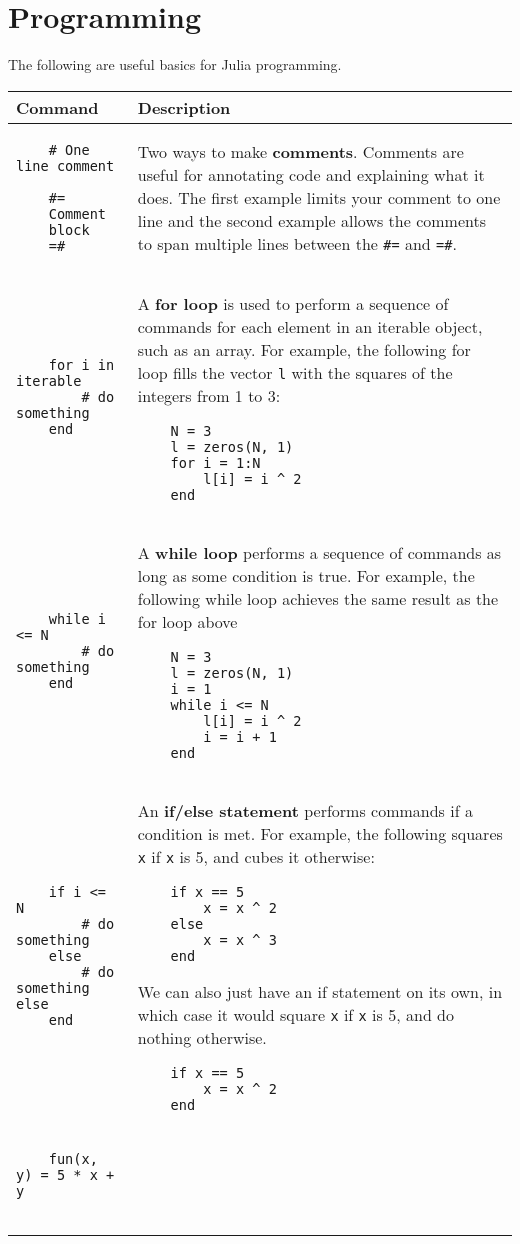 \documentclass[]{article}
\begin{document}
\section{Programming}
The following are useful basics for Julia programming.
\begin{longtable}{ |m{6cm}  | m{11cm} |}
	\hline
	\textbf{Command} & \textbf{Description}
	\\\hline
	\begin{verbatim}
    # One line comment

    #=
    Comment 
    block
    =#
	\end{verbatim}
	& Two ways to make \textbf{comments}. Comments are useful for annotating
    code and explaining what it does. The first example limits your comment to
    one line and the second example allows the comments to span multiple lines
    between the \texttt{\#=} and \texttt{=\#}.
    \\\hline
\begin{verbatim}
    for i in iterable
        # do something
    end
	\end{verbatim}
	& A \textbf{for loop} is used to perform a sequence of commands for each
    element in an iterable object, such as an array. For example, the
    following for loop fills the vector \texttt{l} with the squares of the
    integers from 1 to 3:
    \begin{verbatim}
    N = 3
    l = zeros(N, 1)
    for i = 1:N
        l[i] = i ^ 2
    end
    \end{verbatim}
    \\\hline
\begin{verbatim}
    while i <= N
        # do something
    end
	\end{verbatim}
	& A \textbf{while loop} performs a sequence of commands as long as some
    condition is true. For example, the
    following while loop achieves the same result as the for loop above
    \begin{verbatim}
    N = 3
    l = zeros(N, 1)
    i = 1
    while i <= N
        l[i] = i ^ 2
        i = i + 1
    end
    \end{verbatim}
    \\\hline
\begin{verbatim}
    if i <= N
        # do something
    else
        # do something else
    end
	\end{verbatim}
	& An \textbf{if/else statement} performs commands if a condition is met. For example, the
    following squares \texttt{x} if \texttt{x} is 5, and cubes it otherwise:
    \begin{verbatim}
    if x == 5
        x = x ^ 2
    else
        x = x ^ 3
    end
    \end{verbatim}
    We can also just have an if statement on its own, in which case it would
    square \texttt{x} if \texttt{x} is 5, and do nothing otherwise.
    \begin{verbatim}
    if x == 5
        x = x ^ 2
    end
    \end{verbatim}
    \\\hline
\begin{verbatim}
    fun(x, y) = 5 * x + y


\end{verbatim}
\end{longtable}
\end{document}
